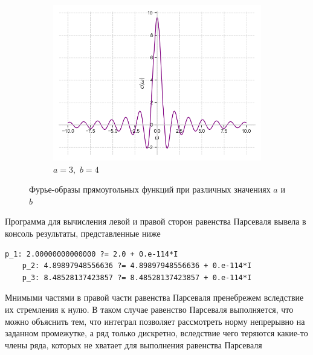 \documentclass[a4paper, 16pt]{article}
\begin{document}
\begin{figure}[htbp]
\begin{subfigure}{0.3\textwidth}
        \end{subfigure}
        \hfill
        \begin{subfigure}{0.3\textwidth}
            \centering
            \includegraphics[width=\linewidth]{rectfimg_a=3_b=4.png}
            \caption{$a=3,\,\,b=4$}
            \label{fig:rectfimg_3}
        \end{subfigure}
        \caption{Фурье-образы прямоугольных функций при различных значениях $a$ и $b$}
        \label{fig:rectfimgs}
    \end{figure}




    \noindent Программа для вычисления левой и правой сторон равенства Парсеваля вывела в консоль результаты, представленные ниже
    \begin{lstlisting}[label=pres_rectf, caption=Результат выполнения программы для вычисления равенства Парсеваля]
    p_1: 2.00000000000000 ?= 2.0 + 0.e-114*I  
    p_2: 4.89897948556636 ?= 4.89897948556636 + 0.e-114*I 
    p_3: 8.48528137423857 ?= 8.48528137423857 + 0.e-114*I
    \end{lstlisting}


    \noindent Мнимыми частями в правой части равенства Парсеваля пренебрежем вследствие их стремления к нулю. В таком случае равенство Парсеваля выполняется, что можно объяснить тем, что интеграл позволяет
    рассмотреть норму непрерывно на заданном промежутке, а ряд только дискретно, вследствие чего теряются какие-то члены ряда,
    которых не хватает для выполнения равенства Парсеваля
\end{document}
